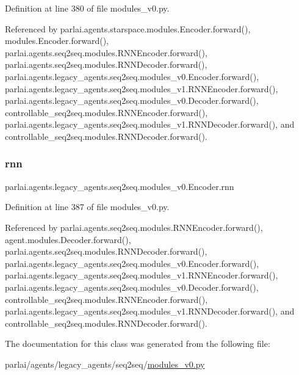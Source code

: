 Definition at line 380 of file modules\+\_\+v0.\+py.



Referenced by parlai.\+agents.\+starspace.\+modules.\+Encoder.\+forward(), modules.\+Encoder.\+forward(), parlai.\+agents.\+seq2seq.\+modules.\+R\+N\+N\+Encoder.\+forward(), parlai.\+agents.\+seq2seq.\+modules.\+R\+N\+N\+Decoder.\+forward(), parlai.\+agents.\+legacy\+\_\+agents.\+seq2seq.\+modules\+\_\+v0.\+Encoder.\+forward(), parlai.\+agents.\+legacy\+\_\+agents.\+seq2seq.\+modules\+\_\+v1.\+R\+N\+N\+Encoder.\+forward(), parlai.\+agents.\+legacy\+\_\+agents.\+seq2seq.\+modules\+\_\+v0.\+Decoder.\+forward(), controllable\+\_\+seq2seq.\+modules.\+R\+N\+N\+Encoder.\+forward(), parlai.\+agents.\+legacy\+\_\+agents.\+seq2seq.\+modules\+\_\+v1.\+R\+N\+N\+Decoder.\+forward(), and controllable\+\_\+seq2seq.\+modules.\+R\+N\+N\+Decoder.\+forward().

\mbox{\label{classparlai_1_1agents_1_1legacy__agents_1_1seq2seq_1_1modules__v0_1_1Encoder_adced0493c6365cc7c123b848858f047d}} 
\subsubsection{\texorpdfstring{rnn}{rnn}}
{\footnotesize\ttfamily parlai.\+agents.\+legacy\+\_\+agents.\+seq2seq.\+modules\+\_\+v0.\+Encoder.\+rnn}



Definition at line 387 of file modules\+\_\+v0.\+py.



Referenced by parlai.\+agents.\+seq2seq.\+modules.\+R\+N\+N\+Encoder.\+forward(), agent.\+modules.\+Decoder.\+forward(), parlai.\+agents.\+seq2seq.\+modules.\+R\+N\+N\+Decoder.\+forward(), parlai.\+agents.\+legacy\+\_\+agents.\+seq2seq.\+modules\+\_\+v0.\+Encoder.\+forward(), parlai.\+agents.\+legacy\+\_\+agents.\+seq2seq.\+modules\+\_\+v1.\+R\+N\+N\+Encoder.\+forward(), parlai.\+agents.\+legacy\+\_\+agents.\+seq2seq.\+modules\+\_\+v0.\+Decoder.\+forward(), controllable\+\_\+seq2seq.\+modules.\+R\+N\+N\+Encoder.\+forward(), parlai.\+agents.\+legacy\+\_\+agents.\+seq2seq.\+modules\+\_\+v1.\+R\+N\+N\+Decoder.\+forward(), and controllable\+\_\+seq2seq.\+modules.\+R\+N\+N\+Decoder.\+forward().



The documentation for this class was generated from the following file\+:\begin{DoxyCompactItemize}
\item 
parlai/agents/legacy\+\_\+agents/seq2seq/\hyperlink{seq2seq_2modules__v0_8py}{modules\+\_\+v0.\+py}\end{DoxyCompactItemize}
